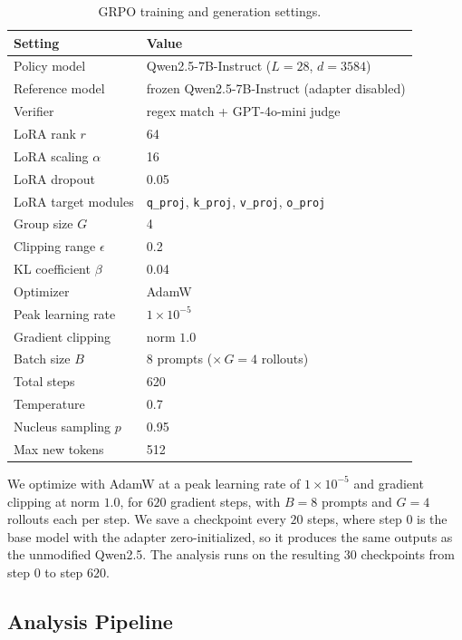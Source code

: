 \begin{table}[t]
	\centering
	\renewcommand{\arraystretch}{1.2}
	\begin{tabular}{ll}
		\toprule
		\textbf{Setting} & \textbf{Value} \\
		\midrule
		Policy model        & Qwen2.5-7B-Instruct ($L=28$, $d=3584$) \\
		Reference model     & frozen Qwen2.5-7B-Instruct (adapter disabled) \\
		Verifier            & regex match + GPT-4o-mini judge \\
		LoRA rank $r$       & 64 \\
		LoRA scaling $\alpha$ & 16 \\
		LoRA dropout        & 0.05 \\
		LoRA target modules & \texttt{q\_proj}, \texttt{k\_proj}, \texttt{v\_proj}, \texttt{o\_proj} \\
		Group size $G$      & 4 \\
		Clipping range $\epsilon$ & 0.2 \\
		KL coefficient $\beta$    & 0.04 \\
		Optimizer           & AdamW \\
		Peak learning rate  & $1\times10^{-5}$ \\
		Gradient clipping   & norm $1.0$ \\
		Batch size $B$      & 8 prompts ($\times\,G=4$ rollouts) \\
		Total steps         & 620 \\
		Temperature         & 0.7 \\
		Nucleus sampling $p$ & 0.95 \\
		Max new tokens      & 512 \\
		\bottomrule
	\end{tabular}
	\caption{GRPO training and generation settings.}
	\label{tab:grpo-hyperparams}
\end{table}

We optimize with AdamW at a peak learning rate of $1\times10^{-5}$ and gradient
clipping at norm $1.0$, for $620$ gradient steps, with $B=8$ prompts and $G=4$
rollouts each per step. We save a checkpoint every $20$ steps, where step $0$ is the
base model with the adapter zero-initialized, so it produces the same outputs as the
unmodified Qwen2.5. The analysis runs on the resulting $30$ checkpoints from step $0$
to step $620$.

\subsection{Analysis Pipeline}
\label{subsec:grpo-pipeline}


